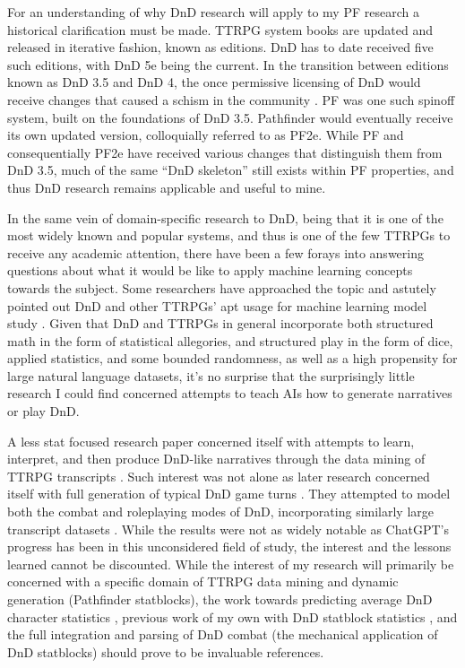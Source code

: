 \documentclass[11pt]{article}
\begin{document}
For an understanding of why DnD research will apply to my PF research a historical clarification must be made. TTRPG system books are updated and released in iterative fashion, known as editions. DnD has to date received five such editions, with DnD 5e being the current. In the transition between editions known as DnD 3.5 and DnD 4, the once permissive licensing of DnD would receive changes that caused a schism in the community \cite{author_2011}. PF was one such spinoff system, built on the foundations of DnD 3.5. Pathfinder would eventually receive its own updated version, colloquially referred to as PF2e. While PF and consequentially PF2e have received various changes that distinguish them from DnD 3.5, much of the same ``DnD skeleton'' still exists within PF properties, and thus DnD research remains applicable and useful to mine.

In the same vein of domain-specific research to DnD, being that it is one of the most widely known and popular systems, and thus is one of the few TTRPGs to receive any academic attention, there have been a few forays into answering questions about what it would be like to apply machine learning concepts towards the subject. Some researchers have approached the topic and astutely pointed out DnD and other TTRPGs' apt usage for machine learning model study \cite{Martin2018DungeonsAD, DBLP:journals/corr/abs-2007-06108}. Given that DnD and TTRPGs in general incorporate both structured math in the form of statistical allegories, and structured play in the form of dice, applied statistics, and some bounded randomness, as well as a high propensity for large natural language datasets, it's no surprise that the surprisingly little research I could find concerned attempts to teach AIs how to generate narratives or play DnD.

A less stat focused research paper concerned itself with attempts to learn, interpret, and then produce DnD-like narratives through the data mining of TTRPG transcripts \cite{louis-sutton-2018-deep}. Such interest was not alone as later research concerned itself with full generation of typical DnD game turns \cite{https://doi.org/10.48550/arxiv.2210.07109}. They attempted to model both the combat and roleplaying modes of DnD, incorporating similarly large transcript datasets \cite{https://doi.org/10.48550/arxiv.2210.07109}. While the results were not as widely notable as ChatGPT's progress has been in this unconsidered field of study, the interest and the lessons learned cannot be discounted. While the interest of my research will primarily be concerned with a specific domain of TTRPG data mining and dynamic generation (Pathfinder statblocks), the work towards predicting average DnD character statistics \cite{MacInnes2019TheDS}, previous work of my own with DnD statblock statistics \cite{vess-dev_2022}, and the full integration and parsing of DnD combat (the mechanical application of DnD statblocks) \cite{https://doi.org/10.48550/arxiv.2210.07109} should prove to be invaluable references.
\end{document}
